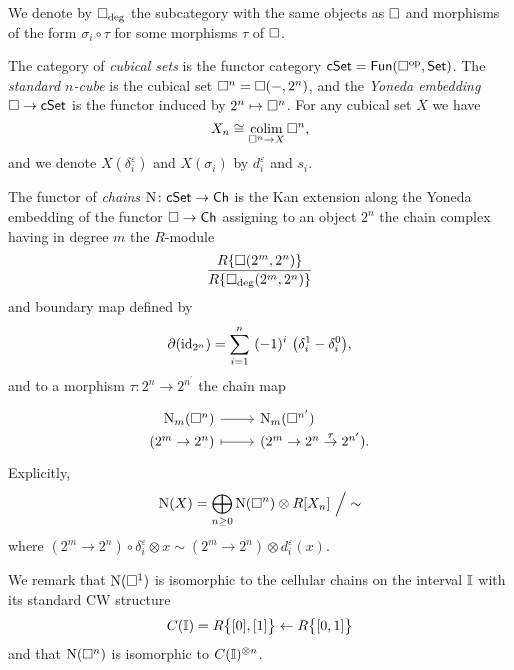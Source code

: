 We denote by $\square_{\deg}$ the subcategory with the same objects as $\square$ and morphisms of the form $\sigma_i \circ \tau$ for some morphisms $\tau$ of $\square$.

The category of \textit{cubical sets} is the functor category $\mathsf{cSet} = \mathsf{Fun}(\square^{\mathrm{op}}, \mathsf{Set})$.
The \textit{standard $n$-cube} is the cubical set $\square^n = \square(-, 2^n)$, and the \textit{Yoneda embedding} $\square \to \mathsf{cSet}$ is the functor induced by $2^n \mapsto \square^n$.
For any cubical set $X$ we have
\begin{equation*}
X_n \cong \operatorname*{colim}_{\square^n \to X} \square^n,
\end{equation*}
and we denote $X(\delta_i^\varepsilon)$ and $X(\sigma_i)$ by $d_i^\varepsilon$ and $s_i$.


The functor of \textit{chains} $\operatorname{N} \colon \mathsf{cSet} \to \mathsf{Ch}$ is the Kan extension along the Yoneda embedding of the functor $\square \to \mathsf{Ch}$ assigning to an object $2^n$ the chain complex having in degree $m$ the $R$-module
\begin{equation*}
\frac{R\{\square(2^m, 2^n)\}}{R\{\square_{\deg}(2^m, 2^n)\}}
\end{equation*}
and boundary map defined by
\begin{equation*}
\partial (\id_{2^n}) = \sum_{i=1}^{n} \ (-1)^i \
\big(\delta_i^1 - \delta_i^0 \big),
\end{equation*}
and to a morphism $\tau \colon 2^n \to 2^{n^\prime}$ the chain map
\begin{equation*}
\begin{tikzcd}[row sep=-3pt, column sep=normal,
/tikz/column 1/.append style={anchor=base east},
/tikz/column 2/.append style={anchor=base west}]
\chains_m(\cube^n) \arrow[r] &  \chains_m(\cube^{n^\prime}) \\
(2^m \to 2^n) \arrow[r, mapsto] & (2^m \to 2^n \stackrel{\tau}{\to} 2^{n^\prime}).
\end{tikzcd}
\end{equation*}
Explicitly,
\begin{equation*}
\operatorname{N}(X) = \bigoplus_{n \geq 0} \operatorname{N}(\square^n) \otimes R[X_n] \ \Big/ \sim
\end{equation*}
where $(2^m \to 2^n) \circ \delta_i^\varepsilon \otimes x \sim (2^m \to 2^n) \otimes d_i^\varepsilon(x)$.

We remark that $\operatorname{N}(\square^1)$ is isomorphic to the cellular chains on the interval $\bm{\mathbb{I}}$ with its standard CW structure
\begin{equation*}
C(\bm{\mathbb{I}}) = R \big\{ [0], [1] \big\} \leftarrow R \big\{ [0,1] \big\}
\end{equation*}
and that $\operatorname{N}(\square^n)$ is isomorphic to $C(\bm{\mathbb{I}})^{\otimes n}$.

